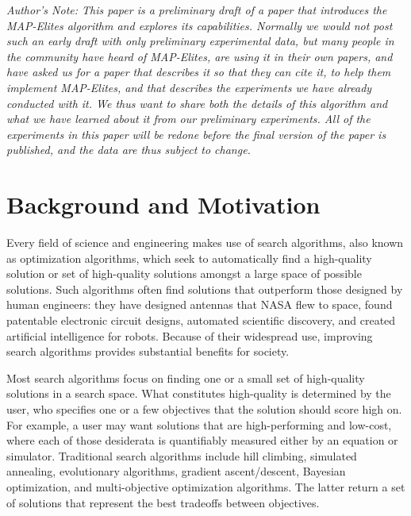 \documentclass[twocolumn, DIV25, 9pt]{scrartcl}
\begin{document}
\vspace{3ex}
\emph{
Author's Note: This paper is a preliminary draft of a paper that introduces the MAP-Elites algorithm and explores its capabilities. Normally we would not post such an early draft with only preliminary experimental data, but many people in the community have heard of MAP-Elites, are using it in their own papers, and have asked us for a paper that describes it so that they can cite it, to help them implement MAP-Elites, and that describes the experiments we have already conducted with it. We thus want to share both the details of this algorithm and what we have learned about it from our preliminary experiments. All of the experiments in this paper will be redone before the final version of the paper is published, and the data are thus subject to change.} 

%
\section{Background and Motivation}
\vspace{2ex}
Every field of science and engineering makes use of search algorithms, also known as optimization algorithms, which seek to automatically find a high-quality solution or set of high-quality solutions amongst a large space of possible solutions\cite{russell1995artificial,floreano2008bio}. Such algorithms often find solutions that outperform those designed by human engineers\cite{koza2003genetic}: they have designed antennas that NASA flew to space\cite{hornby2011computer}, found patentable electronic circuit designs\cite{koza2003genetic}, automated scientific discovery\cite{schmidt2009distilling}, and created artificial intelligence for robots\cite{cully2015robots,clune2011performance, cheney2013unshackling,hornby2005autonomous,doncieux2015evolutionary, yosinski2011gaits, lee2013evolving, clune2009evolving, cully2015evolving, lipson2000automatic}. Because of their widespread use, improving search algorithms provides substantial benefits for society.
%

Most search algorithms focus on finding one or a small set of high-quality solutions in a search space. What constitutes high-quality is determined by the user, who specifies one or a few objectives that the solution should score high on. For example, a user may want solutions that are high-performing and low-cost, where each of those desiderata is quantifiably measured either by an equation or simulator. Traditional search algorithms include hill climbing, simulated annealing, evolutionary algorithms, gradient ascent/descent, Bayesian optimization, and multi-objective optimization algorithms\cite{russell1995artificial,floreano2008bio}. The latter return a set of solutions that represent the best tradeoffs between objectives\cite{deb2001multi}. 
\end{document}
